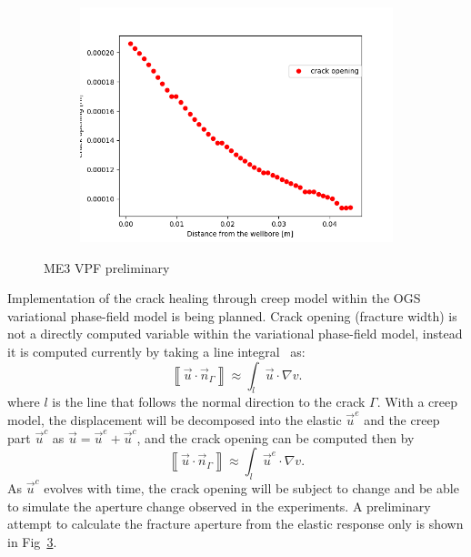 \begin{figure}[!ht]
\begin{subfigure}[c]{0.49\textwidth}
\label{fig:ME3_VPF_model}
\end{subfigure}
\hfill
\begin{subfigure}[c]{0.49\textwidth}
\includegraphics[width=1\textwidth]{figures/ME3_CrackWidth.png}
\label{fig:ME3_VPF_crack width}
\end{subfigure}
\caption{ME3 VPF preliminary}
\label{fig:VPF_ME2_creep}
\end{figure}

Implementation of the crack healing through creep model within the OGS variational phase-field model is being planned.
Crack opening (fracture width) is not a directly computed variable within the variational phase-field model, instead it is computed currently by taking a line integral~\cite{Yoshioka2020} as:
\begin{equation}
\left \llbracket \vec{u}\cdot \vec{n}_\Gamma \right\rrbracket
\approx \int_{l} \vec{u} \cdot \nabla v .
\label{eq:width_line_integral}
\end{equation}
where $l$ is the line that follows the normal direction to the crack $\Gamma$.
With a creep model, the displacement will be decomposed into the elastic $\vec{u}^e$ and the creep part $\vec{u}^c$ as $\vec{u} = \vec{u}^e+\vec{u}^c$, and the crack opening can be computed then by
\begin{equation}
\left \llbracket \vec{u}\cdot \vec{n}_\Gamma \right\rrbracket
\approx \int_{l} \vec{u}^e \cdot \nabla v .
\label{eq:width_line_integral}
\end{equation}
As $\vec{u}^c$ evolves with time, the crack opening will be subject to change and be able to simulate the aperture change observed in the experiments.
A preliminary attempt to calculate the fracture aperture from the elastic response only is shown in  Fig~\ref{fig:VPF_ME2_creep}.

